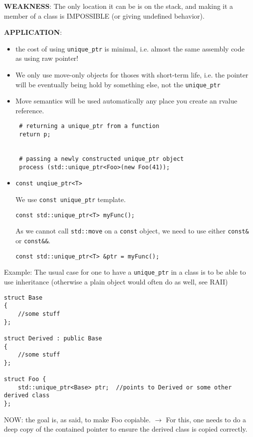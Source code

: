 {\bf WEAKNESS}: The only location it can be is on the stack, and making it a
member of a class is IMPOSSIBLE (or giving undefined behavior).

{\bf APPLICATION}:
\begin{itemize}
  \item the cost of using \verb!unique_ptr! is minimal, i.e. almost the
  same assembly code as using raw pointer!
  
%   
  
  \item We only use move-only objects for thoses with short-term life, i.e. the
  pointer will be eventually being hold by something else, not the
  \verb!unique_ptr!
  
  \item  Move semantics will be used automatically any place you create an rvalue
reference. 

\begin{verbatim}
 # returning a unique_ptr from a function
 return p;
 
 
 # passing a newly constructed unique_ptr object
 process (std::unique_ptr<Foo>(new Foo(41));
\end{verbatim}

  \item \verb!const unqiue_ptr<T>!
  
We use \verb!const unique_ptr!
template.

\begin{verbatim}
const std::unique_ptr<T> myFunc();
\end{verbatim}
As we cannot call \verb!std::move! on a \verb!const! object, we need to use
either \verb!const&! or \verb!const&&!.

\begin{verbatim}
const std::unique_ptr<T> &ptr = myFunc();
\end{verbatim}
  
\end{itemize}


Example: The usual case for one to have a \verb!unique_ptr! in a class is to be able to
use inheritance (otherwise a plain object would often do as well, see RAII)

\begin{verbatim}
struct Base
{
    //some stuff
};

struct Derived : public Base
{
    //some stuff
};

struct Foo {
    std::unique_ptr<Base> ptr;  //points to Derived or some other derived class
};
\end{verbatim}
NOW: the goal is, as said, to make Foo copiable. $\rightarrow$ For this, one
needs to do a deep copy of the contained pointer to ensure the derived class is
copied correctly.


